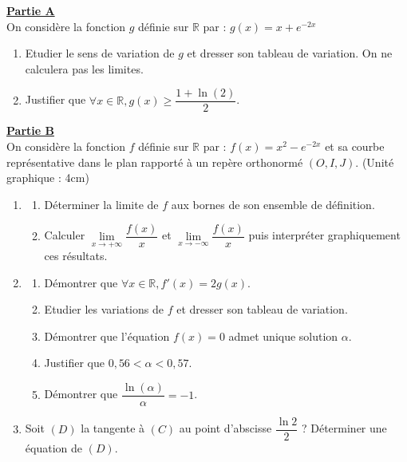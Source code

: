 \documentclass[12pt,a4paper]{article}
\begin{document}
\vspace{0.3cm}

\noindent \underline{\textbf{Partie A}} \\
On considère la fonction $g$ définie sur $\mathbb{R}$ par : $g(x) = x + e^{-2x}$
\begin{enumerate}
    \item Etudier le sens de variation de $g$ et dresser son tableau de variation. On ne calculera pas les limites.
    \item Justifier que $\forall x \in \mathbb{R} , g(x) \ge \dfrac{1+\ln(2)}{2}$.
\end{enumerate}

\vspace{0.5cm}

\noindent \underline{\textbf{Partie B}} \\
On considère la fonction $f$ définie sur $\mathbb{R}$ par : $f(x) = x^2 - e^{-2x}$ et sa courbe représentative dans le plan rapporté à un repère orthonormé $(O, I, J)$. (Unité graphique : 4cm)
\begin{enumerate}
    \item \begin{enumerate}
        \item Déterminer la limite de $f$ aux bornes de son ensemble de définition.
        \item Calculer $\lim\limits_{x \to +\infty} \dfrac{f(x)}{x}$ et $\lim\limits_{x \to -\infty} \dfrac{f(x)}{x}$ puis interpréter graphiquement ces résultats.
    \end{enumerate}
    \item \begin{enumerate}
        \item Démontrer que $\forall x \in \mathbb{R} , f'(x) = 2g(x)$.
        \item Etudier les variations de $f$ et dresser son tableau de variation.
        \item Démontrer que l'équation $f(x) = 0$ admet unique solution $\alpha$.
        \item Justifier que $0,56 < \alpha < 0,57$.
        \item Démontrer que $\dfrac{\ln(\alpha)}{\alpha} = -1$.
    \end{enumerate}
    \item Soit $(D)$ la tangente à $(C)$ au point d'abscisse $\dfrac{\ln 2}{2}$ ? Déterminer une équation de $(D)$.
\end{enumerate}

\vspace{0.5cm}
\end{document}
